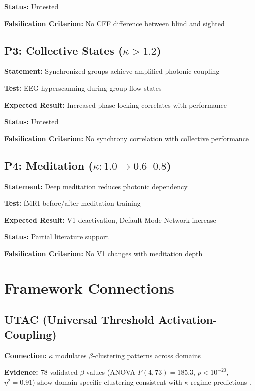 \documentclass[11pt,a4paper]{article}
\begin{document}
\textbf{Status:} Untested

\textbf{Falsification Criterion:} No CFF difference between blind and sighted

\subsection{P3: Collective States ($\kappa > 1.2$)}

\textbf{Statement:} Synchronized groups achieve amplified photonic coupling

\textbf{Test:} EEG hyperscanning during group flow states

\textbf{Expected Result:} Increased phase-locking correlates with performance

\textbf{Status:} Untested

\textbf{Falsification Criterion:} No synchrony correlation with collective performance

\subsection{P4: Meditation ($\kappa: 1.0 \to 0.6$--$0.8$)}

\textbf{Statement:} Deep meditation reduces photonic dependency

\textbf{Test:} fMRI before/after meditation training

\textbf{Expected Result:} V1 deactivation, Default Mode Network increase

\textbf{Status:} Partial literature support \cite{Brefczynski2007, Vago2012}

\textbf{Falsification Criterion:} No V1 changes with meditation depth

\section{Framework Connections}

\subsection{UTAC (Universal Threshold Activation-Coupling)}

\textbf{Connection:} $\kappa$ modulates $\beta$-clustering patterns across domains

\textbf{Evidence:} 78 validated $\beta$-values (ANOVA $F(4,73) = 185.3$, $p < 10^{-20}$, $\eta^2 = 0.91$) show domain-specific clustering consistent with $\kappa$-regime predictions \cite{Roemer2025_UTAC}.
\end{document}
